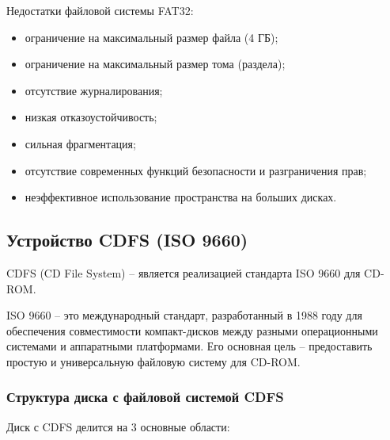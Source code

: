 Недостатки файловой системы FAT32:

\begin{itemize}
\item ограничение на максимальный размер файла (4 ГБ);
\item ограничение на максимальный размер тома (раздела);
\item отсутствие журналирования;
\item низкая отказоустойчивость;
\item сильная фрагментация;
\item отсутствие современных функций безопасности и разграничения прав;
\item неэффективное использование пространства на больших дисках.
\end{itemize}

\subsection{Устройство CDFS (ISO 9660)}

CDFS (CD File System) -- является реализацией стандарта ISO 9660 для CD-ROM.

ISO 9660 -- это международный стандарт, разработанный в 1988 году для обеспечения совместимости компакт-дисков между разными операционными системами и аппаратными платформами. Его основная цель -- предоставить простую и универсальную файловую систему для CD-ROM.

\subsubsection{Структура диска с файловой системой CDFS}

Диск с CDFS делится на 3 основные области:

